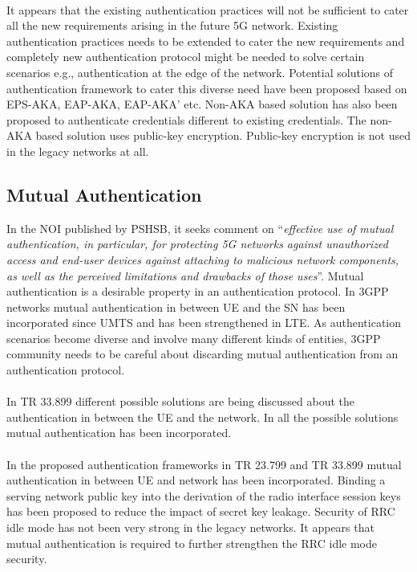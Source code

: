 \documentclass[12pt]{llncs}
\newcommand\ques[1]{``\emph{#1}''}
\begin{document}
\paragraph{}
It appears that the existing authentication practices will not be sufficient to cater all the new requirements arising in the future 5G network. Existing authentication practices needs to be extended to cater the new requirements and completely new authentication protocol might be needed to solve certain scenarios e.g., authentication at the edge of the network. Potential solutions of authentication framework to cater this diverse need have been proposed based on EPS-AKA, EAP-AKA, EAP-AKA' etc. Non-AKA based solution has also been proposed to authenticate credentials different to existing credentials. The non-AKA based solution uses public-key encryption. Public-key encryption is not used in the legacy networks at all.  

\subsection{Mutual Authentication}
In the NOI published by PSHSB, it seeks comment on \ques{effective use of mutual authentication, in particular, for protecting 5G networks against unauthorized access and end-user devices against attaching to malicious network components, as well as the perceived limitations and drawbacks of those uses}. Mutual authentication is a desirable property in an authentication protocol. In 3GPP networks mutual authentication in between UE and the SN has been incorporated since UMTS and has been strengthened in LTE. As authentication scenarios become diverse and involve many different kinds of entities, 3GPP community needs to be careful about discarding mutual authentication from an authentication protocol. 
\paragraph{}
In TR 33.899 different possible solutions are being discussed about the authentication in between the UE and the network. In all the possible solutions mutual authentication has been incorporated. 
\paragraph{}
In the proposed authentication frameworks in TR 23.799 and TR 33.899 mutual authentication in between UE and network has been incorporated. Binding a serving network public key into the derivation of the radio interface session keys has been proposed to reduce the impact of secret key leakage. Security of RRC idle mode has not been very strong in the legacy networks. It appears that mutual authentication is required to further strengthen the RRC idle mode security.
\end{document}
